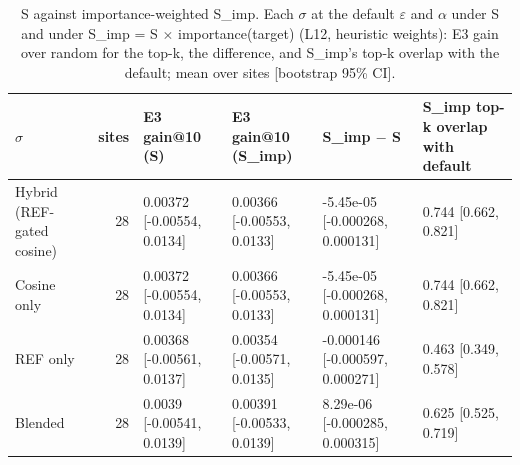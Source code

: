 \begin{table}[t]
\centering
\small
\caption{S against importance-weighted S\_imp. Each $\sigma$ at the default $\varepsilon$ and $\alpha$ under S and under S\_imp = S $\times$ importance(target) (L12, heuristic weights): E3 gain over random for the top-k, the difference, and S\_imp's top-k overlap with the default; mean over sites [bootstrap 95\% CI].}
\label{tab:t5_e7_scoring}
\begin{tabular}{lrllll}
\toprule
$\sigma$ & sites & E3 gain@10 (S) & E3 gain@10 (S\_imp) & S\_imp $-$ S & S\_imp top-k overlap with default \\
\midrule
Hybrid (REF-gated cosine) & 28 & 0.00372 [-0.00554, 0.0134] & 0.00366 [-0.00553, 0.0133] & -5.45e-05 [-0.000268, 0.000131] & 0.744 [0.662, 0.821] \\
Cosine only & 28 & 0.00372 [-0.00554, 0.0134] & 0.00366 [-0.00553, 0.0133] & -5.45e-05 [-0.000268, 0.000131] & 0.744 [0.662, 0.821] \\
REF only & 28 & 0.00368 [-0.00561, 0.0137] & 0.00354 [-0.00571, 0.0135] & -0.000146 [-0.000597, 0.000271] & 0.463 [0.349, 0.578] \\
Blended & 28 & 0.0039 [-0.00541, 0.0139] & 0.00391 [-0.00533, 0.0139] & 8.29e-06 [-0.000285, 0.000315] & 0.625 [0.525, 0.719] \\
\bottomrule
\end{tabular}
\end{table}
